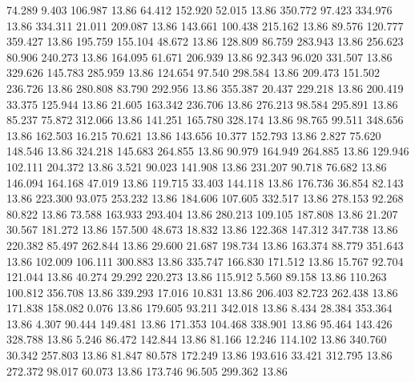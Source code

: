   74.289    9.403  106.987        13.86
  64.412  152.920   52.015        13.86
 350.772   97.423  334.976        13.86
 334.311   21.011  209.087        13.86
 143.661  100.438  215.162        13.86
  89.576  120.777  359.427        13.86
 195.759  155.104   48.672        13.86
 128.809   86.759  283.943        13.86
 256.623   80.906  240.273        13.86
 164.095   61.671  206.939        13.86
  92.343   96.020  331.507        13.86
 329.626  145.783  285.959        13.86
 124.654   97.540  298.584        13.86
 209.473  151.502  236.726        13.86
 280.808   83.790  292.956        13.86
 355.387   20.437  229.218        13.86
 200.419   33.375  125.944        13.86
  21.605  163.342  236.706        13.86
 276.213   98.584  295.891        13.86
  85.237   75.872  312.066        13.86
 141.251  165.780  328.174        13.86
  98.765   99.511  348.656        13.86
 162.503   16.215   70.621        13.86
 143.656   10.377  152.793        13.86
   2.827   75.620  148.546        13.86
 324.218  145.683  264.855        13.86
  90.979  164.949  264.885        13.86
 129.946  102.111  204.372        13.86
   3.521   90.023  141.908        13.86
 231.207   90.718   76.682        13.86
 146.094  164.168   47.019        13.86
 119.715   33.403  144.118        13.86
 176.736   36.854   82.143        13.86
 223.300   93.075  253.232        13.86
 184.606  107.605  332.517        13.86
 278.153   92.268   80.822        13.86
  73.588  163.933  293.404        13.86
 280.213  109.105  187.808        13.86
  21.207   30.567  181.272        13.86
 157.500   48.673   18.832        13.86
 122.368  147.312  347.738        13.86
 220.382   85.497  262.844        13.86
  29.600   21.687  198.734        13.86
 163.374   88.779  351.643        13.86
 102.009  106.111  300.883        13.86
 335.747  166.830  171.512        13.86
  15.767   92.704  121.044        13.86
  40.274   29.292  220.273        13.86
 115.912    5.560   89.158        13.86
 110.263  100.812  356.708        13.86
 339.293   17.016   10.831        13.86
 206.403   82.723  262.438        13.86
 171.838  158.082    0.076        13.86
 179.605   93.211  342.018        13.86
   8.434   28.384  353.364        13.86
   4.307   90.444  149.481        13.86
 171.353  104.468  338.901        13.86
  95.464  143.426  328.788        13.86
   5.246   86.472  142.844        13.86
  81.166   12.246  114.102        13.86
 340.760   30.342  257.803        13.86
  81.847   80.578  172.249        13.86
 193.616   33.421  312.795        13.86
 272.372   98.017   60.073        13.86
 173.746   96.505  299.362        13.86
